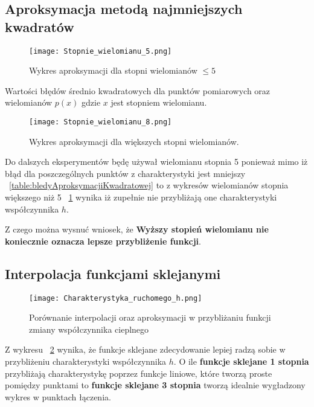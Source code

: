 \documentclass[varwidth,12pt,a4paper]{article}
\begin{document}
\subsection{Aproksymacja metodą najmniejszych kwadratów}

\begin{figure}[H]
    \texttt{[image: Stopnie\_wielomianu\_5.png]} 
    \caption{Wykres aproksymacji dla stopni wielomianów $\le 5$}
\end{figure}

\begin{table}[H]
    \centering{}
    \caption{Wartości błędów średnio kwadratowych dla punktów pomiarowych oraz wielomianów $p(x)$ gdzie $x$
    jest stopniem wielomianu.}
    \label{table:bledyAproksymacjiKwadratowej}
\end{table}

\begin{figure}[H]
    \texttt{[image: Stopnie\_wielomianu\_8.png]} 
    \caption{Wykres aproksymacji dla większych stopni wielomianów.}
    \label{fig:duzeStopnieWielomianow}
\end{figure}

Do dalszych eksperymentów będę używał wielomianu stopnia 5 ponieważ 
mimo iż błąd dla poszczególnych punktów z charakterystyki jest mniejszy ~\ref{table:bledyAproksymacjiKwadratowej} to 
z wykresów wielomianów stopnia większego niż 5 ~\ref{fig:duzeStopnieWielomianow} wynika iż zupełnie nie przybliżają
one charakterystyki współczynnika $h$.

Z czego można wysnuć wniosek, że \textbf{Wyższy stopień wielomianu nie koniecznie oznacza lepsze przybliżenie funkcji}.

\subsection{Interpolacja funkcjami sklejanymi}

\begin{figure}[H]
    \texttt{[image: Charakterystyka\_ruchomego\_h.png]} 
    \caption{Porównanie interpolacji oraz aproksymacji w przybliżaniu funkcji zmiany współczynnika cieplnego}
    \label{fig:interpolacjaAproksymacja}
\end{figure}

Z wykresu ~\ref{fig:interpolacjaAproksymacja} wynika, że funkcje sklejane zdecydowanie lepiej radzą sobie w przybliżeniu charakterystyki
współczynnika $h$. O ile \textbf{funkcje sklejane 1 stopnia} przybliżają charakterystykę poprzez funkcje
liniowe, które tworzą proste pomiędzy punktami to \textbf{funkcje sklejane 3 stopnia} tworzą idealnie
wygładzony wykres w punktach łączenia.
\end{document}
